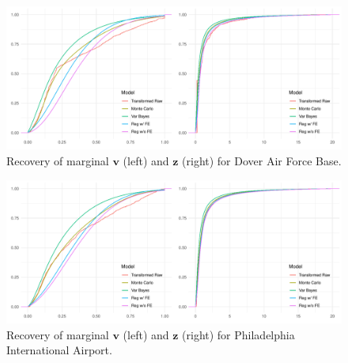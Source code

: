 \begin{figure}[ht]
    \caption{Recovery of marginal $\bm{v}$ (left) and $\bm{z}$ (right) for 
        Dover Air Force Base.\label{plot:marginal_doverafb}}
    \centering
    \includegraphics[width=\textwidth]{./plots/delaware_marginal_dover_afb}
\end{figure}

\begin{figure}[ht]
    \caption{Recovery of marginal $\bm{v}$ (left) and $\bm{z}$ (right) for 
        Philadelphia International Airport.\label{plot:marginal_pia}}
    \centering
    \includegraphics[width=\textwidth]{./plots/delaware_marginal_phil_ia}
\end{figure}
